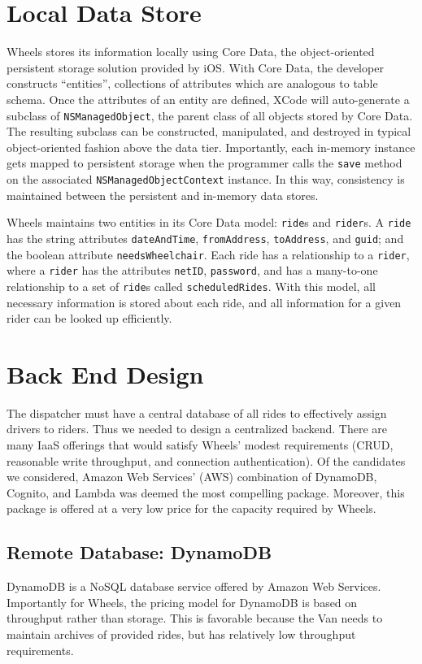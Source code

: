 \documentclass[12pt, a4paper]{article}
\begin{document}
\begin{multicols*}{2}
\section{Local Data Store}\label{sec:local-db}
Wheels stores its information locally using Core Data, the object-oriented persistent storage solution provided by iOS. With Core Data, the developer constructs ``entities'', collections of attributes which are analogous to table schema. Once the attributes of an entity are defined, XCode will auto-generate a subclass of \texttt{NSManagedObject}, the parent class of all objects stored by Core Data. The resulting subclass can be constructed, manipulated, and destroyed in typical object-oriented fashion above the data tier. Importantly, each in-memory instance gets mapped to persistent storage when the programmer calls the \texttt{save} method on the associated \texttt{NSManagedObjectContext} instance. In this way, consistency is maintained between the persistent and in-memory data stores.

Wheels maintains two entities in its Core Data model: \texttt{ride}s and \texttt{rider}s. A \texttt{ride} has the string attributes \texttt{dateAndTime}, \texttt{fromAddress}, \texttt{toAddress}, and \texttt{guid}; and the boolean attribute \texttt{needsWheelchair}. Each ride has a relationship to a \texttt{rider}, where a \texttt{rider} has the attributes \texttt{netID}, \texttt{password}, and has a many-to-one relationship to a set of \texttt{ride}s called \texttt{scheduledRides}. With this model, all necessary information is stored about each ride, and all information for a given rider can be looked up efficiently.
\section{Back End Design}\label{sec:back-end}
The dispatcher must have a central database of all rides to effectively assign drivers to riders. Thus we needed to design a centralized backend. There are many IaaS offerings that would satisfy Wheels' modest requirements (CRUD, reasonable write throughput, and connection authentication). Of the candidates we considered, Amazon Web Services' (AWS) combination of DynamoDB, Cognito, and Lambda was deemed the most compelling package. Moreover, this package is offered at a very low price for the capacity required by Wheels.
\subsection{Remote Database: DynamoDB}
DynamoDB is a NoSQL database service offered by Amazon Web Services. Importantly for Wheels, the pricing model for DynamoDB is based on throughput rather than storage. This is favorable because the Van needs to maintain archives of provided rides, but has relatively low throughput requirements.


\end{multicols*}
\end{document}
